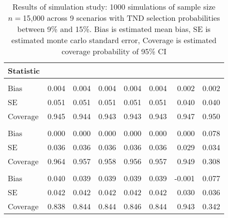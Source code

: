 \begin{table}

\caption{Results of simulation study: 1000 simulations of sample size $n=$15,000 across 9 scenarios with TND selection probabilities between 9\% and 15\%. Bias is estimated mean bias, SE is estimated monte carlo standard error, Coverage is estimated coverage probability of 95\% CI}\label{tab:sims}
\centering
\begin{tabular}[t]{lddddddd}
\toprule
Statistic &   &   &   &  &  &  &  \\
\midrule
\addlinespace[0.3em]
\\
\hspace{1em}Bias & 0.004 & 0.004 & 0.004 & 0.004 & 0.004 & 0.002 & 0.002\\
\hspace{1em}SE & 0.051 & 0.051 & 0.051 & 0.051 & 0.051 & 0.040 & 0.040\\
\hspace{1em}Coverage & 0.945 & 0.944 & 0.943 & 0.943 & 0.943 & 0.947 & 0.950\\
\addlinespace[0.3em]
\\
\hspace{1em}Bias & 0.000 & 0.000 & 0.000 & 0.000 & 0.000 & 0.000 & 0.078\\
\hspace{1em}SE & 0.036 & 0.036 & 0.036 & 0.036 & 0.036 & 0.029 & 0.034\\
\hspace{1em}Coverage & 0.964 & 0.957 & 0.958 & 0.956 & 0.957 & 0.949 & 0.308\\
\addlinespace[0.3em]
\\
\hspace{1em}Bias & 0.040 & 0.039 & 0.039 & 0.039 & 0.039 & -0.001 & 0.077\\
\hspace{1em}SE & 0.042 & 0.042 & 0.042 & 0.042 & 0.042 & 0.030 & 0.036\\
\hspace{1em}Coverage & 0.838 & 0.844 & 0.844 & 0.846 & 0.844 & 0.943 & 0.342\\

\end{tabular}
\end{table}
